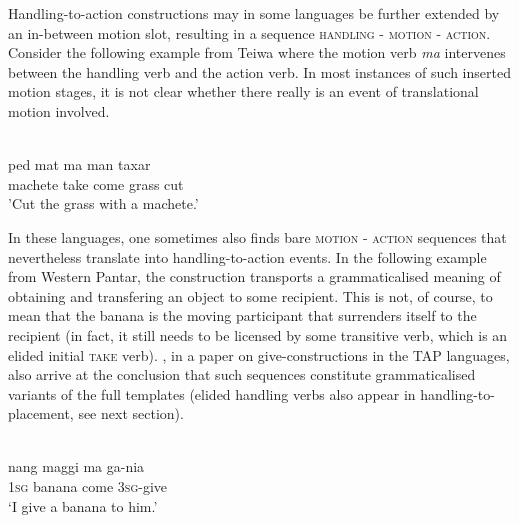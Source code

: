 Handling-to-action constructions may in some languages be further extended by an in-between motion slot, resulting in a sequence \textsc{handling - motion - action}. Consider the following example from Teiwa where the motion verb \textit{ma} intervenes between the handling verb and the action verb. In most instances of such inserted motion stages, it is not clear whether there really is an event of translational motion involved.

\ea \label{}
\\
\gll ped mat ma man taxar \\
machete take come grass cut \\
\glft 'Cut the grass with a machete.'\\ 
\z

In these languages, one sometimes also finds bare \textsc{motion - action} sequences that nevertheless translate into handling-to-action events. In the following example from Western Pantar, the construction transports a grammaticalised meaning of obtaining and transfering an object to some recipient. This is not, of course, to mean that the banana is the moving participant that surrenders itself to the recipient (in fact, it still needs to be licensed by some transitive verb, which is an elided initial \textsc{take} verb). \citet{klamer2012development}, in a paper on give-constructions in the TAP languages, also arrive at the conclusion that such sequences constitute grammaticalised variants of the full templates (elided handling verbs also appear in handling-to-placement, see next section).

\ea \label{}
\\
\gll nang maggi ma ga-nia \\
\textsc{1}\textsc{sg} banana come \textsc{3}\textsc{sg}-give \\
\glft ‘I give a banana to him.’\\ 
\z

